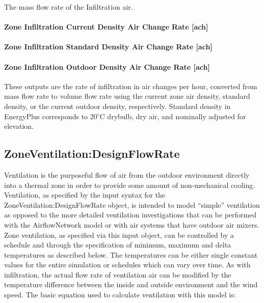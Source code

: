 The mass flow rate of the Infiltration air.

\paragraph{Zone Infiltration Current Density Air Change Rate {[}ach{]}}\label{zone-infiltration-air-change-rate-ach}
\paragraph{Zone Infiltration Standard Density Air Change Rate {[}ach{]}}\label{zone-infiltration-standard-air-change-rate-ach}
\paragraph{Zone Infiltration Outdoor Density Air Change Rate {[}ach{]}}\label{zone-infiltration-outdoor-air-change-rate-ach}

These outputs are the rate of infiltration in air changes per hour, converted from mass flow rate to volume flow rate using the current zone air density, standard density, or the current outdoor density, respectively. Standard density in EnergyPlus corresponds to 20$^\circ$C drybulb, dry air, and nominally adjusted for elevation.

\subsection{ZoneVentilation:DesignFlowRate}\label{zoneventilationdesignflowrate}

Ventilation is the purposeful flow of air from the outdoor environment directly into a thermal zone in order to provide some amount of non-mechanical cooling. Ventilation, as specified by the input syntax for the ZoneVentilation:DesignFlowRate object, is intended to model ``simple'' ventilation as opposed to the more detailed ventilation investigations that can be performed with the AirflowNetwork model or with air systems that have outdoor air mixers. Zone ventilation, as specified via this input object, can be controlled by a schedule and through the specification of minimum, maximum and delta temperatures as described below. The temperatures can be either single constant values for the entire simulation or schedules which can vary over time. As with infiltration, the actual flow rate of ventilation air can be modified by the temperature difference between the inside and outside environment and the wind speed. The basic equation used to calculate ventilation with this model is:

